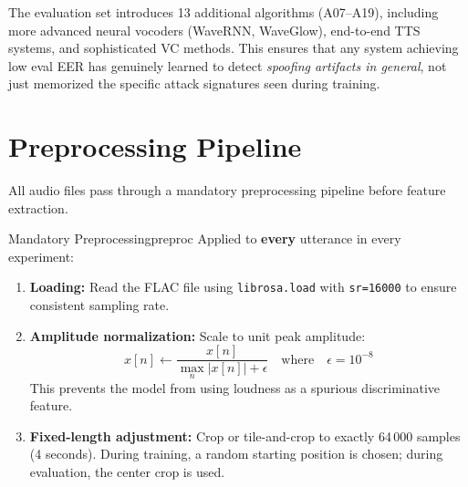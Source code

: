\documentclass[12pt]{report}
\begin{document}
The evaluation set introduces 13 additional algorithms (A07--A19), including more advanced neural
vocoders (WaveRNN, WaveGlow), end-to-end TTS systems, and sophisticated VC methods. This ensures
that any system achieving low eval EER has genuinely learned to detect \emph{spoofing artifacts
in general}, not just memorized the specific attack signatures seen during training.

\section{Preprocessing Pipeline}

All audio files pass through a mandatory preprocessing pipeline before feature extraction.

\begin{tecbox}{Mandatory Preprocessing}{preproc}
    Applied to \textbf{every} utterance in every experiment:
    \begin{enumerate}[noitemsep]
        \item \textbf{Loading:} Read the FLAC file using \texttt{librosa.load} with
              \texttt{sr=16000} to ensure consistent sampling rate.
        \item \textbf{Amplitude normalization:} Scale to unit peak amplitude:
              \begin{equation}
                  x[n] \leftarrow \frac{x[n]}{\max_n |x[n]| + \epsilon}
                  \quad\text{where}\quad \epsilon = 10^{-8}
              \end{equation}
              This prevents the model from using loudness as a spurious discriminative feature.
        \item \textbf{Fixed-length adjustment:} Crop or tile-and-crop to exactly 64\,000 samples
              (4 seconds). During training, a random starting position is chosen; during
              evaluation, the center crop is used.
    \end{enumerate}
\end{tecbox}
\end{document}
